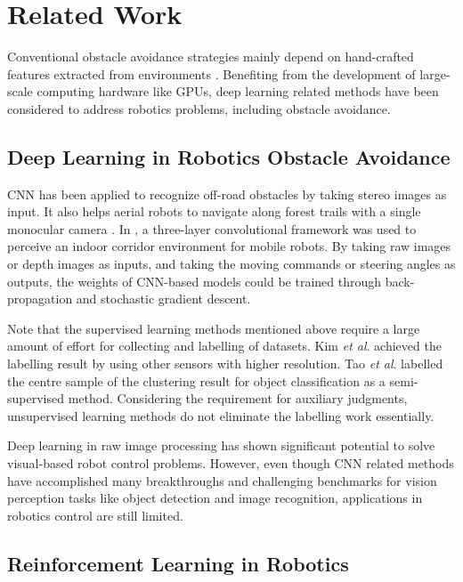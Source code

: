 
\section{Related Work}
\label{sec:ob_rel}

Conventional obstacle avoidance strategies mainly depend on hand-crafted features extracted from environments \cite{kuipers1991robot}.
Benefiting from the development of large-scale computing hardware like GPUs, deep learning related methods have been considered to address robotics problems, including obstacle avoidance.

\subsection{Deep Learning in Robotics Obstacle Avoidance}
CNN has been applied to recognize off-road obstacles \cite{muller2005off} by taking stereo images as input. It also helps aerial robots to navigate along forest trails with a single monocular camera \cite{giusti2016machine}. In \cite{tai2016deep}, a three-layer convolutional framework was used to perceive an indoor corridor environment for mobile robots. By taking raw images or depth images as inputs, and taking the moving commands or steering angles as outputs, the weights of CNN-based models could be trained through back-propagation and stochastic gradient descent.

Note that the supervised learning methods mentioned above require a large amount of effort for collecting and labelling of datasets. Kim \textit{et al}. \cite{kim2006traversability} achieved the labelling result by using other sensors with higher resolution. Tao \textit{et al}. \cite{tao2015semi} labelled the centre sample of the clustering result for object classification as a semi-supervised method. Considering the requirement for auxiliary judgments, unsupervised learning methods do not eliminate the labelling work essentially.

Deep learning in raw image processing has shown significant potential to solve visual-based robot control problems.
However, even though CNN related methods have accomplished many breakthroughs and challenging benchmarks for vision perception tasks like object detection and image recognition, applications in robotics control are still limited.

\subsection{Reinforcement Learning in Robotics}

